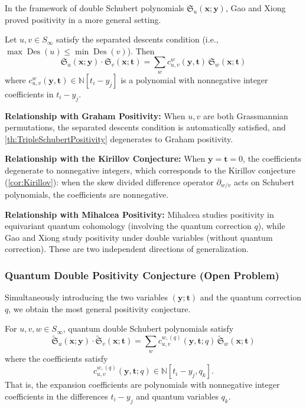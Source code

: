 In the framework of double Schubert polynomials $\mathfrak{S}_u(\mathbf{x}; \mathbf{y})$, Gao and Xiong proved positivity in a more general setting.

\begin{Theorem}
\label{th:TripleSchubertPositivity}
Let $u, v \in S_\infty$ satisfy the separated descents condition (i.e., $\max\operatorname{Des}(u) \leq \min\operatorname{Des}(v)$). Then
$$\mathfrak{S}_u(\mathbf{x}; \mathbf{y}) \cdot \mathfrak{S}_v(\mathbf{x}; \mathbf{t}) = \sum_w c^w_{u,v}(\mathbf{y}, \mathbf{t}) \, \mathfrak{S}_w(\mathbf{x}; \mathbf{t})$$
where $c^w_{u,v}(\mathbf{y}, \mathbf{t}) \in \mathbb{N}[t_i - y_j]$ is a polynomial with nonnegative integer coefficients in $t_i - y_j$.
\end{Theorem}

\textbf{Relationship with Graham Positivity:} When $u, v$ are both Grassmannian permutations, the separated descents condition is automatically satisfied, and \cref{th:TripleSchubertPositivity} degenerates to Graham positivity.

\textbf{Relationship with the Kirillov Conjecture:} When $\mathbf{y} = \mathbf{t} = 0$, the coefficients degenerate to nonnegative integers, which corresponds to the Kirillov conjecture (\cref{cor:Kirillov}): when the skew divided difference operator $\partial_{w/v}$ acts on Schubert polynomials, the coefficients are nonnegative.

\textbf{Relationship with Mihalcea Positivity:} Mihalcea studies positivity in equivariant quantum cohomology (involving the quantum correction $q$), while Gao and Xiong study positivity under double variables (without quantum correction). These are two independent directions of generalization.

\subsubsection{Quantum Double Positivity Conjecture (Open Problem)}
\label{sec:QuantumDoubleConjectureDetail}

Simultaneously introducing the two variables $(\mathbf{y}; \mathbf{t})$ and the quantum correction $q$, we obtain the most general positivity conjecture.

\begin{Conjecture}
\label{conj:QuantumDoubleSchubertPositivity}
For $u, v, w \in S_\infty$, quantum double Schubert polynomials satisfy
$$\widetilde{\mathfrak{S}}_u(\mathbf{x}; \mathbf{y}) \cdot \widetilde{\mathfrak{S}}_{v}(\mathbf{x}; \mathbf{t}) = \sum_w c_{u,v}^{w,(q)}(\mathbf{y}, \mathbf{t}; q) \, \widetilde{\mathfrak{S}}_{w}(\mathbf{x}; \mathbf{t})$$
where the coefficients satisfy
$$c_{u,v}^{w,(q)}(\mathbf{y}, \mathbf{t}; q) \in \mathbb{N}[t_i - y_j, q_k].$$
That is, the expansion coefficients are polynomials with nonnegative integer coefficients in the differences $t_i - y_j$ and quantum variables $q_k$.
\end{Conjecture}

